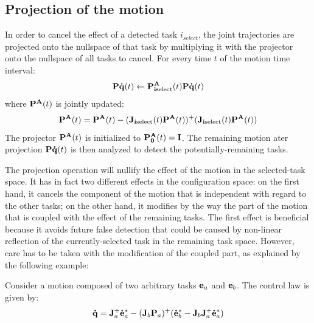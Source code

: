 \documentclass[letterpaper, 10pt, conference]{ieeeconf}      %
\begin{document}
\subsection{Projection of the motion}
In order to cancel the effect of a detected task $i_{select}$, the joint trajectories are projected onto the nullspace
of that task by multiplying it with the projector onto the nullspace of all tasks to cancel.
For every time $t$ of the motion time interval:
\begin{equation}
  {\mathbf{P\dot{q}}}(t) \leftarrow {\mathbf{P^A_{i\mathrm{select}}}}(t) {\mathbf{P\dot{q}}}(t) 
  \label{eq:projection}
\end{equation}
where $ {\mathbf{P^A}}(t)$ is jointly updated:
\begin{equation*}
  {\mathbf{P^A}}(t) = {\mathbf{P^A}}(t) - ({\mathbf{J_{i\mathrm{select}}}}(t){\mathbf{P^A}}(t))^+({\mathbf{J_{i\mathrm{select}}}}(t){\mathbf{P^A}}(t))
  \label{eq:projectionupdate}
\end{equation*}
The projector ${\mathbf{P^A}}(t)$ is initialized to ${\mathbf{P^A_0}}(t) = {\mathbf{I}}$. The
remaining motion ater projection ${\mathbf{P\dot{q}}}(t) $ is then analyzed to
detect the potentially-remaining tasks.

The projection operation will nullify the effect of the motion in the
selected-task space. It has in fact two different effects in the configuration
space: on the first hand, it cancels the component of the motion that is
independent with regard to the other tasks; on the other hand, it modifies by
the way the part of the motion that is coupled with the effect of the remaining
tasks. The first effect is beneficial because it avoids future false
detection that could be caused by non-linear reflection of the
currently-selected task in the remaining task space. However, care has to be taken with the modification of the coupled part, as explained by the following example:

Consider a motion composed of two arbitrary tasks ${\mathbf{e}}_a$ and ${\mathbf{e}}_b$.
The control law is given by:
\begin{equation}
  {\mathbf{\dot{q}}} = {\mathbf{J}}_a^+{\mathbf{\dot{e}}}_a^* - ({\mathbf{J}}_b{\mathbf{P}}_a)^+ ({\mathbf{\dot{e}}}_b^* - {\mathbf{J}}_b{\mathbf{J}}_a^+{\mathbf{\dot{e}}}_a^*)
  \label{eq:controlLaw2Tasks}
\end{equation}
\end{document}
